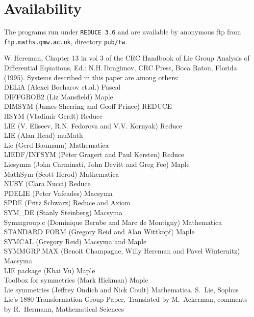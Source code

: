 \documentclass[12pt]{article}
\begin{document}
\section{Availability}
The programs run under {\tt REDUCE 3.6} and are available
by anonymous ftp from \\ {\tt ftp.maths.qmw.ac.uk}, directory 
{\tt pub/tw}.

\begin{thebibliography}{99}
 W.\,Hereman, Chapter 13 in vol 3 of the CRC Handbook of
Lie Group Analysis of Differential Equations, Ed.: N.H.\,Ibragimov,
CRC Press, Boca Raton, Florida (1995).
Systems described in this paper are among others:  \\
DELiA (Alexei Bocharov et.al.) Pascal \\
DIFFGROB2 (Liz Mansfield) Maple \\
DIMSYM (James Sherring and Geoff Prince) REDUCE \\
HSYM (Vladimir Gerdt) Reduce \\
LIE (V. Eliseev, R.N. Fedorova and V.V. Kornyak) Reduce \\
LIE (Alan Head) muMath \\
Lie (Gerd Baumann) Mathematica \\
LIEDF/INFSYM (Peter Gragert and Paul Kersten) Reduce \\
Liesymm (John Carminati, John Devitt and Greg Fee) Maple \\
MathSym (Scott Herod) Mathematica \\
NUSY (Clara Nucci) Reduce \\
PDELIE (Peter Vafeades) Macsyma \\
SPDE (Fritz Schwarz) Reduce and Axiom \\
SYM\_DE (Stanly Steinberg) Macsyma \\
Symmgroup.c (Dominique Berube and Marc de Montigny) Mathematica \\
STANDARD FORM (Gregory Reid and Alan Wittkopf) Maple \\
SYMCAL (Gregory Reid) Macsyma and Maple \\
SYMMGRP.MAX (Benoit Champagne, Willy Hereman and Pavel Winternitz) Macsyma \\
LIE package (Khai Vu) Maple \\
Toolbox for symmetries (Mark Hickman) Maple \\
Lie symmetries (Jeffrey Ondich and Nick Coult) Mathematica.
 S.\, Lie, Sophus Lie's 1880 Transformation Group Paper,
Translated by M.\, Ackerman, comments by R.\, Hermann, Mathematical Sciences 

\end{thebibliography}
\end{document}
